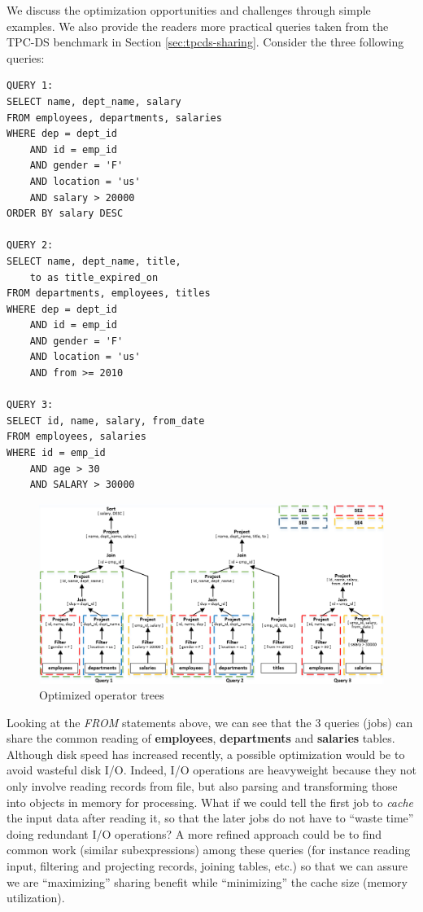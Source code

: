 We discuss the optimization opportunities and challenges through simple examples. We also provide the readers more practical queries taken from the TPC-DS benchmark \cite{tpcds} in Section \ref{sec:tpcds-sharing}. Consider the three following queries:

\begingroup
\fontsize{7pt}{8pt}
\selectfont
\begin{verbatim}
QUERY 1:
SELECT name, dept_name, salary
FROM employees, departments, salaries
WHERE dep = dept_id
	AND id = emp_id
	AND gender = 'F'
	AND location = 'us'
	AND salary > 20000
ORDER BY salary DESC

QUERY 2:
SELECT name, dept_name, title, 
	to as title_expired_on
FROM departments, employees, titles
WHERE dep = dept_id
	AND id = emp_id
	AND gender = 'F'
	AND location = 'us'
	AND from >= 2010

QUERY 3:
SELECT id, name, salary, from_date
FROM employees, salaries
WHERE id = emp_id
	AND age > 30
	AND SALARY > 30000
\end{verbatim}
\endgroup

\begin{figure}[htbp]
	\centering
	\includegraphics[scale=0.65]{figures/common_sub}
	\caption{Optimized operator trees} 
	\label{fig:common_sub}
\end{figure}

Looking at the \emph{FROM} statements above, we can see that the 3 queries (jobs) can share the common reading of \textbf{employees}, \textbf{departments} and \textbf{salaries} tables. Although disk speed has increased recently, a possible optimization would be to avoid wasteful disk I/O. Indeed, I/O operations are heavyweight because they not only involve reading records from file, but also parsing and transforming those into objects in memory for processing. What if we could tell the first job to \emph{cache} the input data after reading it, so that the later jobs do not have to ``waste time'' doing redundant I/O operations? A more refined approach could be to find common work (similar subexpressions) among these queries (for instance reading input, filtering and projecting records, joining tables, etc.) so that we can assure we are ``maximizing'' sharing benefit while ``minimizing'' the cache size (memory utilization).

